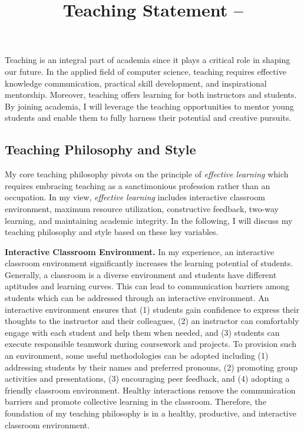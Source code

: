 \documentclass{NSF}
\newcommand{\BfPara}[1]{{\noindent\textbf{#1.}}\xspace}
\begin{document}
\title{Teaching Statement -- }
\thispagestyle{empty}
Teaching is an integral part of academia since it plays a critical role in shaping our future. In the applied field of computer science, teaching requires effective knowledge communication, practical skill development, and inspirational mentorship. Moreover, teaching offers learning for both instructors and students. By joining academia, I will leverage the teaching opportunities to mentor young students and enable them to fully harness their potential and creative pursuits.  


\subsection*{Teaching Philosophy and Style}
My core teaching philosophy pivots on the principle of {\em effective learning} which requires embracing teaching as a sanctimonious profession rather than an occupation. In my view, {\em effective learning} includes interactive classroom environment, maximum resource utilization, constructive feedback, two-way learning, and maintaining academic integrity. In the following, I will discuss my teaching philosophy and style based on these key variables.   


\vspace{1mm}
\BfPara{Interactive Classroom Environment} In my experience, an interactive classroom environment significantly increases the learning potential of students. Generally, a classroom is a diverse environment and students have different aptitudes and learning curves. This can lead to communication barriers among students which can be addressed through an interactive environment. An interactive environment ensures that (1) students gain confidence to express their thoughts to the instructor and their colleagues, (2) an instructor can comfortably engage with each student and help them when needed, and (3) students can execute responsible teamwork during coursework and projects. To provision such an environment, some useful methodologies can be adopted including (1) addressing students by their names and preferred pronouns, (2) promoting group activities and presentations, (3) encouraging peer feedback, and (4) adopting a friendly classroom environment. Healthy interactions remove the communication barriers and promote collective learning in the classroom. Therefore, the foundation of my teaching philosophy is in a healthy, productive, and interactive classroom environment. 
\end{document}
